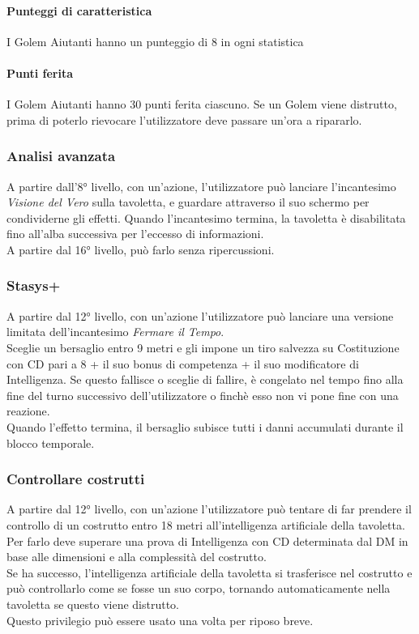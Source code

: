 \paragraph{Punteggi di caratteristica} I Golem Aiutanti hanno un punteggio di 8 in ogni statistica
\paragraph{Punti ferita} I Golem Aiutanti hanno 30 punti ferita ciascuno.
Se un Golem viene distrutto, prima di poterlo rievocare l'utilizzatore deve passare un'ora a ripararlo.

\subsubsection{Analisi avanzata}
A partire dall'8° livello, con un'azione, l'utilizzatore può lanciare l'incantesimo \textit{Visione del Vero} sulla tavoletta, e guardare attraverso il suo schermo per condividerne gli effetti. Quando l'incantesimo termina, la tavoletta è disabilitata fino all'alba successiva per l'eccesso di informazioni.\\ A partire dal 16° livello, può farlo senza ripercussioni.

\subsubsection{Stasys+}
A partire dal 12° livello, con un'azione l'utilizzatore può lanciare una versione limitata dell'incantesimo \textit{Fermare il Tempo}.\\
Sceglie un bersaglio entro 9 metri e gli impone un tiro salvezza su Costituzione con CD pari a 8 + il suo bonus di competenza + il suo modificatore di Intelligenza. Se questo fallisce o sceglie di fallire, è congelato nel tempo fino alla fine del turno successivo dell'utilizzatore o finchè esso non vi pone fine con una reazione.\\
Quando l'effetto termina, il bersaglio subisce tutti i danni accumulati durante il blocco temporale.

\subsubsection{Controllare costrutti}
A partire dal 12° livello, con un'azione l'utilizzatore può tentare di far prendere il controllo di un costrutto entro 18 metri all'intelligenza artificiale della tavoletta.\\ Per farlo deve superare una prova di Intelligenza con CD determinata dal DM in base alle dimensioni e alla complessità del costrutto.\\
Se ha successo, l'intelligenza artificiale della tavoletta si trasferisce nel costrutto e può controllarlo come se fosse un suo corpo, tornando automaticamente nella tavoletta se questo viene distrutto.\\
Questo privilegio può essere usato una volta per riposo breve.

